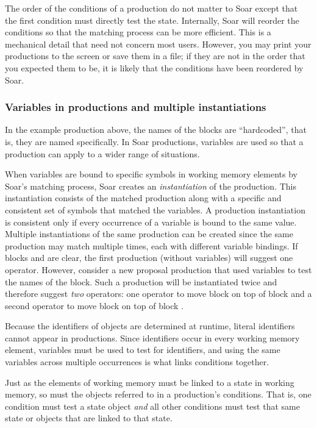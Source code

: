 The order of the conditions of a production do not matter to Soar except that the first condition must directly test the state. Internally, Soar will reorder the conditions so that the matching process can be more efficient. This is a mechanical detail that need not concern most users. However, you may print your productions to the screen or save them in a file; if they are not in the order that you expected them to be, it is likely that the conditions have been reordered by Soar.

\subsubsection{Variables in productions and multiple instantiations}

In the example production above, the names of the blocks are ``hardcoded'', that is, they are named specifically. In Soar productions, variables are used so that a production can apply to a wider range of situations.

When variables are bound to specific symbols in working memory elements by Soar’s matching process, Soar creates an \emph{instantiation} of the production. This instantiation consists of the matched production along with a specific and consistent set of symbols that matched the variables. A production instantiation is consistent only if every occurrence of a variable is bound to the same value. Multiple instantiations of the same production can be created since the same production may match multiple times, each with different variable bindings. If blocks  and  are clear, the first production (without variables) will suggest one operator. However, consider a new proposal production that used variables to test the names of the block.  Such a production will be instantiated twice and therefore suggest \textit{two} operators: one operator to move block  on top of block  and a second operator to move block  on top of block .

Because the identifiers of objects are determined at runtime, literal identifiers cannot appear in productions. Since identifiers occur in every working memory element, variables must be used to test for identifiers, and using the same variables across multiple occurrences is what links conditions together.

Just as the elements of working memory must be linked to a state in working memory, so must the objects referred to in a production's conditions. That is, one condition must test a state object \emph{and} all other conditions must test that same state or objects that are linked to that state.


